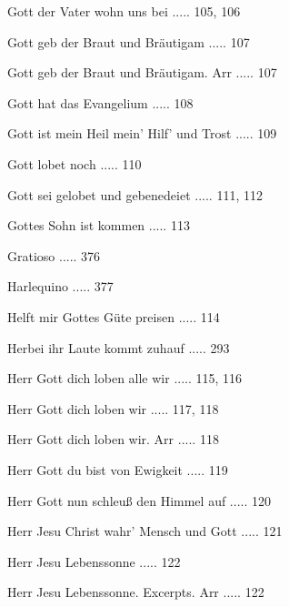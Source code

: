 \documentclass[twocolumn]{book}
\begin{document}
\newline 
Gott der Vater wohn uns bei ..... 105, 106

\newline 
Gott geb der Braut und Bräutigam ..... 107

\newline 
Gott geb der Braut und Bräutigam. Arr ..... 107

\newline 
Gott hat das Evangelium ..... 108

\newline 
Gott ist mein Heil mein' Hilf' und Trost ..... 109

\newline 
Gott lobet noch ..... 110

\newline 
Gott sei gelobet und gebenedeiet ..... 111, 112

\newline 
Gottes Sohn ist kommen ..... 113

\newline 
Gratioso ..... 376

\newline 
Harlequino ..... 377

\newline 
Helft mir Gottes Güte preisen ..... 114

\newline 
Herbei ihr Laute kommt zuhauf ..... 293

\newline 
Herr Gott dich loben alle wir ..... 115, 116

\newline 
Herr Gott dich loben wir ..... 117, 118

\newline 
Herr Gott dich loben wir. Arr ..... 118

\newline 
Herr Gott du bist von Ewigkeit ..... 119

\newline 
Herr Gott nun schleuß den Himmel auf ..... 120

\newline 
Herr Jesu Christ wahr' Mensch und Gott ..... 121

\newline 
Herr Jesu Lebenssonne ..... 122

\newline 
Herr Jesu Lebenssonne. Excerpts. Arr ..... 122
\end{document}
